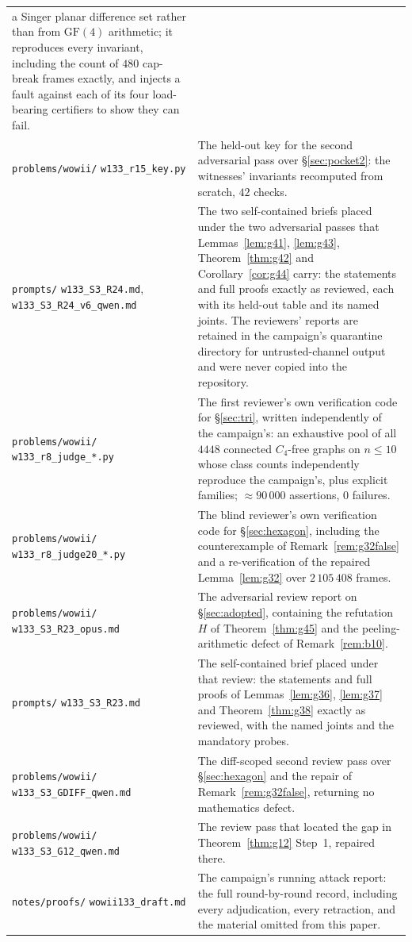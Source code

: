 \documentclass[11pt]{article}
\theoremstyle{plain}
\theoremstyle{definition}
\theoremstyle{remark}
\numberwithin{equation}{section}
\begin{document}
\begin{longtable}{@{}p{}p{}@{}}
a Singer planar difference set rather than from $\mathrm{GF}(4)$ arithmetic; it reproduces
every invariant, including the count of $480$ cap-break frames exactly, and injects a fault
against each of its four load-bearing certifiers to show they can fail. \\
\texttt{problems/wowii/} \texttt{w133\_r15\_key.py} &
The held-out key for the second adversarial pass over \S\ref{sec:pocket2}: the witnesses'
invariants recomputed from scratch, $42$ checks. \\
\texttt{prompts/} \texttt{w133\_S3\_R24.md}, \texttt{w133\_S3\_R24\_v6\_qwen.md} &
The two self-contained briefs placed under the two adversarial passes that
Lemmas~\ref{lem:g41}, \ref{lem:g43}, Theorem~\ref{thm:g42} and Corollary~\ref{cor:g44}
carry: the statements and full proofs exactly as reviewed, each with its held-out table and
its named joints. The reviewers' reports are retained in the campaign's quarantine directory
for untrusted-channel output and were never copied into the repository. \\
\texttt{problems/wowii/} \texttt{w133\_r8\_judge\_*.py} &
The first reviewer's own verification code for \S\ref{sec:tri}, written independently of the
campaign's: an exhaustive pool of all $4448$ connected $C_4$-free graphs on $n\le 10$ whose
class counts independently reproduce the campaign's, plus explicit families;
$\approx 90\,000$ assertions, $0$ failures. \\
\texttt{problems/wowii/} \texttt{w133\_r8\_judge20\_*.py} &
The blind reviewer's own verification code for \S\ref{sec:hexagon}, including the
counterexample of Remark~\ref{rem:g32false} and a re-verification of the repaired
Lemma~\ref{lem:g32} over $2\,105\,408$ frames. \\
\texttt{problems/wowii/} \texttt{w133\_S3\_R23\_opus.md} &
The adversarial review report on \S\ref{sec:adopted}, containing the refutation
$H$ of Theorem~\ref{thm:g45} and the peeling-arithmetic defect of Remark~\ref{rem:b10}. \\
\texttt{prompts/} \texttt{w133\_S3\_R23.md} &
The self-contained brief placed under that review: the statements and full proofs of
Lemmas~\ref{lem:g36}, \ref{lem:g37} and Theorem~\ref{thm:g38} exactly as reviewed, with the
named joints and the mandatory probes. \\
\texttt{problems/wowii/} \texttt{w133\_S3\_GDIFF\_qwen.md} &
The diff-scoped second review pass over \S\ref{sec:hexagon} and the repair of
Remark~\ref{rem:g32false}, returning no mathematics defect. \\
\texttt{problems/wowii/} \texttt{w133\_S3\_G12\_qwen.md} &
The review pass that located the gap in Theorem~\ref{thm:g12} Step~1, repaired there. \\
\texttt{notes/proofs/} \texttt{wowii133\_draft.md} &
The campaign's running attack report: the full round-by-round record, including every
adjudication, every retraction, and the material omitted from this paper. \\
\bottomrule
\end{longtable}
\end{document}

